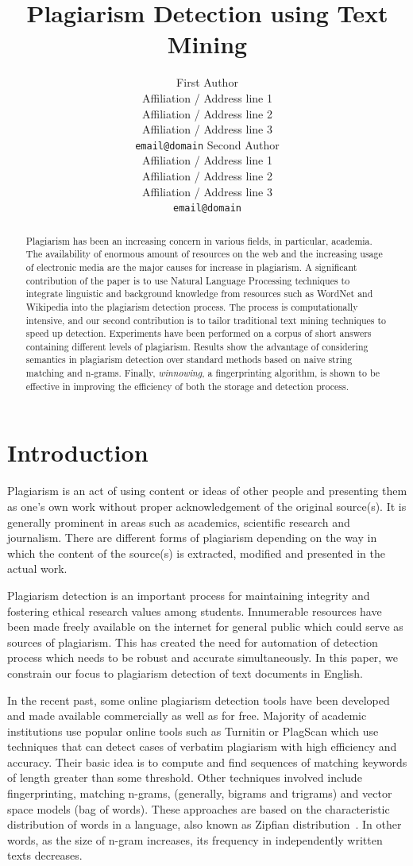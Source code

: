 \documentclass[11pt]{article}
\title{Plagiarism Detection using Text Mining}
\author{First Author\\
  Affiliation / Address line 1\\
  Affiliation / Address line 2\\
  Affiliation / Address line 3\\
  {\tt email@domain}  \And
  Second Author\\
  Affiliation / Address line 1\\
  Affiliation / Address line 2\\
  Affiliation / Address line 3\\
  {\tt email@domain}}
\date{}
\begin{document}
\maketitle
\begin{abstract}
  Plagiarism has been an increasing concern in various fields, in particular, academia. The availability of enormous amount of resources on the web and the increasing usage of electronic media are the major causes for increase in plagiarism. A significant contribution of the paper is to use Natural Language Processing techniques to integrate linguistic and background knowledge from resources such as WordNet and Wikipedia into the plagiarism detection process. The process is computationally intensive, and our second contribution is to tailor traditional text mining techniques to speed up detection. Experiments have been performed on a corpus of short answers containing different levels of plagiarism. Results show the advantage of considering semantics in plagiarism detection over standard methods based on naive string matching and n-grams. Finally, {\em  winnowing}, a fingerprinting algorithm, is shown to be effective in improving the efficiency of both the storage and detection process.
\end{abstract}

\section{Introduction}\label{1}

Plagiarism is an act of using content or ideas of other people and presenting them as one's own work without proper acknowledgement of the original source(s). It is generally prominent in areas such as academics, scientific research and journalism. There are different forms of plagiarism depending on the way in which the content of the source(s) is extracted, modified and presented in the actual work.

Plagiarism detection is an important process for maintaining integrity and fostering ethical research values among students. Innumerable resources have been made freely available on the internet for general public which could serve as sources of plagiarism. This has created the need for automation of detection process which needs to be robust and accurate simultaneously. In this paper, we constrain our focus to plagiarism detection of text documents in English.

In the recent past, some online plagiarism detection tools have been developed and made available commercially as well as for free. Majority of academic institutions use popular online tools such as Turnitin or PlagScan which use techniques that can detect cases of verbatim plagiarism with high efficiency and accuracy. Their basic idea is to compute and find sequences of matching keywords of length greater than some threshold. Other techniques involved include fingerprinting, matching n-grams, (generally, bigrams and trigrams) and vector space models (bag of words). These approaches are based on the characteristic distribution of words in a language, also known as Zipfian distribution~\cite{manning:99}. In other words, as the size of n-gram increases, its frequency in independently written texts decreases.
\end{document}
